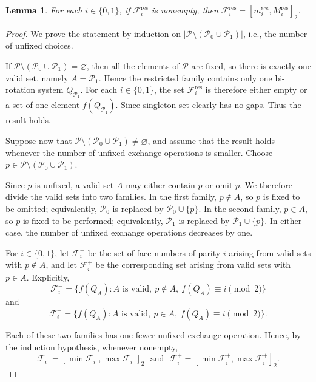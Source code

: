 \documentclass[12pt]{article}
\newtheorem{lemma}[theorem]{Lemma}
\theoremstyle{definition}
\newcommand{\intervaltwo}[2]{[#1,#2]_2}
\begin{document}
\begin{lemma}
\label{lem4:2}
For each $i\in\{0,1\}$, if
$\mathcal F_i^{\mathrm{res}}$
is nonempty, then $\mathcal F_i^{\mathrm{res}}=\intervaltwo{m_i^{\mathrm{res}}}{M_i^{\mathrm{res}}}$.
\end{lemma}


\begin{proof}
We prove the statement by induction on
$\left|\mathcal P\setminus(\mathcal P_0\cup\mathcal P_1)\right|$,
i.e., the number of unfixed choices.

If $\mathcal P\setminus(\mathcal P_0\cup\mathcal P_1)=\varnothing$, then all the elements of $\mathcal P$ are fixed, so there is exactly one valid set, namely $A=\mathcal P_1$. Hence the restricted family contains only one bi-rotation system $Q_{\mathcal P_1}$. For each $i\in\{0,1\}$, the set $\mathcal F_i^{\mathrm{res}}$ is therefore either empty or  a set of one-element ${f(Q_{\mathcal P_1})}$. Since  singleton set clearly has no gaps. Thus the result holds.

Suppose now that $\mathcal P\setminus(\mathcal P_0\cup\mathcal P_1)\neq\varnothing$, and assume that the result holds whenever the number of unfixed exchange operations is smaller. Choose $p\in\mathcal P\setminus(\mathcal P_0\cup\mathcal P_1)$.

Since $p$ is unfixed, a valid set $A$ may either contain $p$ or omit $p$. We therefore divide the valid sets into two families. In the first family, $p\notin A$, so $p$ is fixed to be omitted; equivalently, $\mathcal P_0$ is replaced by $\mathcal P_0\cup\{p\}$. In the second family, $p\in A$, so $p$ is fixed to be performed; equivalently, $\mathcal P_1$ is replaced by $\mathcal P_1\cup\{p\}$. In either case, the number of unfixed exchange operations decreases by one.

For $i\in\{0,1\}$, let $\mathcal F_i^-$ be the set of face numbers of parity $i$ arising from valid sets with $p\notin A$, and let $\mathcal F_i^+$ be the corresponding set arising from valid sets with $p\in A$. Explicitly,
\[
\mathcal F_i^-= \bigl\{f(Q_A):A\text{ is valid},\ p\notin A,\ f(Q_A)\equiv i\pmod 2\bigr\}
\]
and
\[
\mathcal F_i^+= \bigl\{f(Q_A):A\text{ is valid},\ p\in A,\ f(Q_A)\equiv i\pmod 2\bigr\}.
\]

Each of these two families has one fewer unfixed exchange operation. Hence, by the induction hypothesis, whenever nonempty,  $$\mathcal F_i^-= \intervaltwo{\min\mathcal F_i^-}{\max\mathcal F_i^-}~~~ \mbox{and}~~~\mathcal F_i^+= \intervaltwo{\min\mathcal F_i^+}{\max\mathcal F_i^+}.$$


\end{proof}
\end{document}
